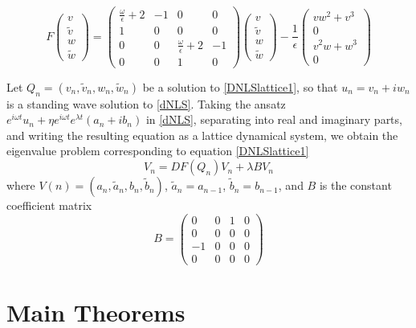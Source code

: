 \documentclass[12pt]{article}
\begin{document}
\begin{equation}\label{FdNLS}
F\begin{pmatrix}
v \\ \tilde{v} \\ w \\ \tilde{w}
\end{pmatrix} =
\begin{pmatrix}
\frac{\omega}{\epsilon} + 2 & -1 & 0 & 0 \\
1 & 0 & 0 & 0 \\
0 & 0 & \frac{\omega}{\epsilon} + 2 & -1 \\
0 & 0 & 1 & 0
\end{pmatrix}
\begin{pmatrix}
v \\ \tilde{v} \\ w \\ \tilde{w}
\end{pmatrix}
- \frac{1}{\epsilon} 
\begin{pmatrix}
v w^2 + v^3 \\ 0 \\ v^2 w + w^3 \\ 0
\end{pmatrix}
\end{equation}

Let $Q_n = (v_n, \tilde{v}_n, w_n, \tilde{w}_n)$ be a solution to \eqref{DNLSlattice1}, so that $u_n = v_n + i w_n$ is a standing wave solution to \eqref{dNLS}. Taking the ansatz $e^{i\omega t} u_n + \eta e^{i\omega t} e^{\lambda t} (a_n + i b_n)$ in \eqref{dNLS}, separating into real and imaginary parts, and writing the resulting equation as a lattice dynamical system, we obtain the eigenvalue problem corresponding to equation \eqref{DNLSlattice1}
\begin{equation}\label{dNLSlatticeEVP}
V_n = DF(Q_n) V_n + \lambda B V_n
\end{equation}
where $V(n) = (a_n, \tilde{a}_n, b_n, \tilde{b}_n)$, $\tilde{a}_n = a_{n-1}$, $\tilde{b}_n = b_{n-1}$, and $B$ is the constant coefficient matrix 
\begin{equation}\label{dNLSB}
B = 
\begin{pmatrix}
0 & 0 & 1 & 0 \\
0 & 0 & 0 & 0 \\
-1 & 0 & 0 & 0 \\
0 & 0 & 0 & 0
\end{pmatrix}
\end{equation}

\section{Main Theorems}
\end{document}
